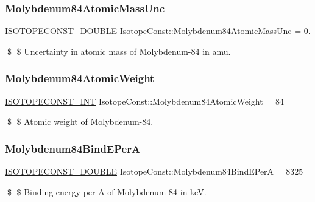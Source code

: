 \subsubsection{\texorpdfstring{Molybdenum84\+Atomic\+Mass\+Unc}{Molybdenum84AtomicMassUnc}}
{\footnotesize\ttfamily \mbox{\hyperlink{group___isotope_const-_macros_ga8f45a7272ce02c0b4c65c44636ed719a}{I\+S\+O\+T\+O\+P\+E\+C\+O\+N\+S\+T\+\_\+\+D\+O\+U\+B\+LE}} Isotope\+Const\+::\+Molybdenum84\+Atomic\+Mass\+Unc = 0.}

\$ \$ Uncertainty in atomic mass of Molybdenum-\/84 in amu. \mbox{\label{group___isotope_const-_molybdenum-_mo84_gae73cc3beb589bd07ef27c3fbaa2592f1}} 
\subsubsection{\texorpdfstring{Molybdenum84\+Atomic\+Weight}{Molybdenum84AtomicWeight}}
{\footnotesize\ttfamily \mbox{\hyperlink{group___isotope_const-_macros_ga5f18360b3e99483a35c32d789e62621c}{I\+S\+O\+T\+O\+P\+E\+C\+O\+N\+S\+T\+\_\+\+I\+NT}} Isotope\+Const\+::\+Molybdenum84\+Atomic\+Weight = 84}

\$ \$ Atomic weight of Molybdenum-\/84. \mbox{\label{group___isotope_const-_molybdenum-_mo84_gaa20fd3235003d9846c2153dfb089c674}} 
\subsubsection{\texorpdfstring{Molybdenum84\+Bind\+E\+PerA}{Molybdenum84BindEPerA}}
{\footnotesize\ttfamily \mbox{\hyperlink{group___isotope_const-_macros_ga8f45a7272ce02c0b4c65c44636ed719a}{I\+S\+O\+T\+O\+P\+E\+C\+O\+N\+S\+T\+\_\+\+D\+O\+U\+B\+LE}} Isotope\+Const\+::\+Molybdenum84\+Bind\+E\+PerA = 8325}

\$ \$ Binding energy per A of Molybdenum-\/84 in keV. \mbox{\label{group___isotope_const-_molybdenum-_mo84_ga0a8cef9c00dc6f54f9d7a2a184d26319}} 
